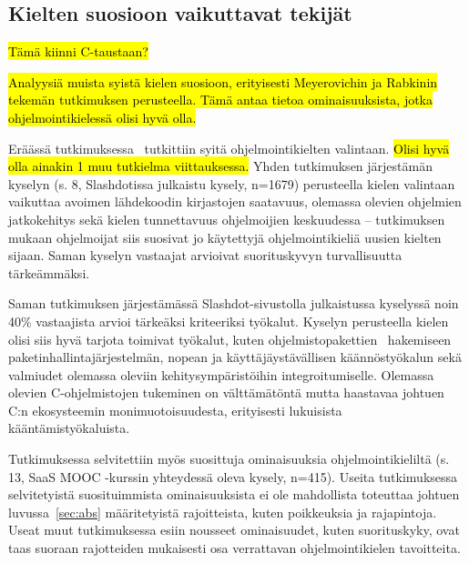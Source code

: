 
\subsection{Kielten suosioon vaikuttavat tekijät}
\label{sec:suosio}

\hl{Tämä kiinni C-taustaan?}

\hl{Analyysiä muista syistä kielen suosioon, erityisesti Meyerovichin ja
Rabkinin tekemän tutkimuksen perusteella. Tämä antaa tietoa ominaisuuksista,
jotka ohjelmointikielessä olisi hyvä olla.}

Eräässä tutkimuksessa~\citep{empiricalpopularity} tutkittiin syitä
ohjelmointikielten valintaan. \hl{Olisi hyvä olla ainakin 1 muu tutkielma
viittauksessa.} Yhden tutkimuksen järjestämän kyselyn (s. 8,
\mbox{Slashdotissa} julkaistu kysely, n=1679) perusteella kielen valintaan
vaikuttaa avoimen lähdekoodin kirjastojen saatavuus, olemassa olevien ohjelmien
jatkokehitys sekä kielen tunnettavuus ohjelmoijien keskuudessa -- tutkimuksen
mukaan ohjelmoijat siis suosivat jo käytettyjä ohjelmointikieliä uusien kielten
sijaan. Saman kyselyn vastaajat arvioivat suorituskyvyn turvallisuutta
tärkeämmäksi.

Saman tutkimuksen järjestämässä Slashdot-sivustolla julkaistussa kyselyssä noin
40\% vastaajista arvioi tärkeäksi kriteeriksi työkalut. Kyselyn perusteella
kielen olisi siis hyvä tarjota toimivat työkalut, kuten
ohjelmistopakettien~ hakemiseen
paketinhallintajärjestelmän, nopean ja
käyttäjäystävällisen käännöstyökalun sekä valmiudet olemassa oleviin
kehitysympäristöihin integroitumiselle. Olemassa olevien C-ohjelmistojen
tukeminen on välttämätöntä mutta haastavaa johtuen C:n ekosysteemin
monimuotoisuudesta, erityisesti lukuisista kääntämistyökaluista.

Tutkimuksessa selvitettiin myös suosittuja ominaisuuksia ohjelmointikieliltä
(s. 13, SaaS MOOC -kurssin yhteydessä oleva kysely, n=415). Useita
tutkimuksessa selvitetyistä suosituimmista ominaisuuksista ei ole mahdollista
toteuttaa johtuen luvussa~\ref{sec:abs} määritetyistä rajoitteista, kuten
poikkeuksia ja rajapintoja. Useat muut tutkimuksessa esiin nousseet
ominaisuudet, kuten suorituskyky, ovat taas suoraan rajotteiden mukaisesti osa
verrattavan ohjelmointikielen tavoitteita.

